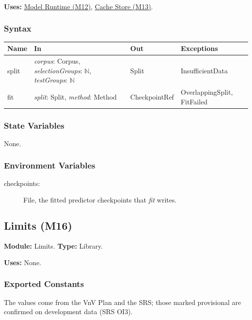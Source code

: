 \documentclass[12pt, titlepage]{article}
\begin{document}
\textbf{Uses:} \hyperref[mModelRun]{Model Runtime (M12)}, \hyperref[mCache]{Cache Store (M13)}.

\subsubsection*{Syntax}

\begin{tabularx}{\textwidth}{l X l X}
\toprule
\textbf{Name} & \textbf{In} & \textbf{Out} & \textbf{Exceptions}\\
\midrule
split & \emph{corpus}: Corpus, \emph{selectionGroups}: $\mathbb{N}$, \emph{testGroups}: $\mathbb{N}$ & Split & InsufficientData\\
fit & \emph{split}: Split, \emph{method}: Method & CheckpointRef & OverlappingSplit, FitFailed\\
\bottomrule
\end{tabularx}

\subsubsection*{State Variables}

None.

\subsubsection*{Environment Variables}

\begin{description}
\item[checkpoints:] File, the fitted predictor checkpoints that \emph{fit} writes.
\end{description}

\newpage
\subsection{Limits (M16)}\label{mLimits}

\textbf{Module:} Limits. \textbf{Type:} Library.

\textbf{Uses:} None.

\subsubsection*{Exported Constants}

The values come from the
VnV Plan \citep[Appendix, Symbolic Parameters]{TandemVnV}
and the SRS; those marked provisional are confirmed on development data (SRS OI3).
\end{document}
